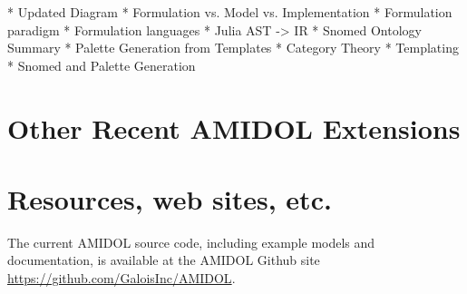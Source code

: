\documentclass[11pt]{article}
\theoremstyle{definition}
\newcommand{\amidol}{\textsc{AMIDOL}}
\begin{document}
  * Updated Diagram
  * Formulation vs. Model vs. Implementation
    * Formulation paradigm
    * Formulation languages
  * Julia AST -> IR
  * Snomed Ontology Summary
  * Palette Generation from Templates
    * Category Theory
    * Templating
    * Snomed and Palette Generation

\section{Other Recent AMIDOL Extensions}

\section{Resources, web sites, etc.}

The current \amidol{} source code, including example models and documentation, is available at the \amidol{} Github site \url{https://github.com/GaloisInc/AMIDOL}.


\end{document}
